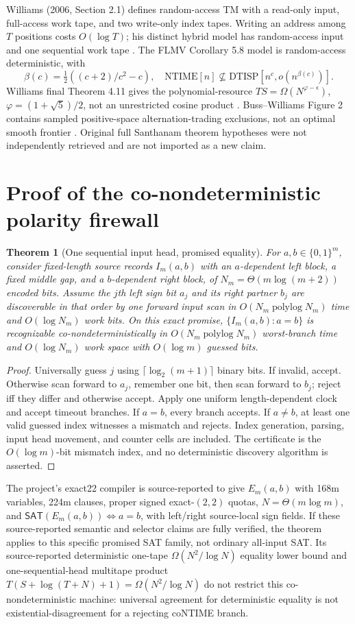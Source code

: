 \documentclass[11pt]{article}
\newtheorem{theorem}{Theorem}
\newcommand{\SAT}{\mathsf{SAT}}
\begin{document}
Williams (2006, Section 2.1) defines random-access TM with a read-only input, full-access work tape, and two write-only index tapes. Writing an address among $T$ positions costs $O(\log T)$; his distinct hybrid model has random-access input and one sequential work tape \cite{w06}. The FLMV Corollary 5.8 model is random-access deterministic, with
\[
\beta(c)=\tfrac12((c+2)/c^2-c),\quad
\mathrm{NTIME}[n]\not\subseteq\mathrm{DTISP}[n^c,o(n^{\beta(c)})].
\]
Williams final Theorem 4.11 gives the polynomial-resource $TS=\Omega(N^{\varphi-\epsilon})$, $\varphi=(1+\sqrt5)/2$, not an unrestricted cosine product \cite{w13}. Buss--Williams Figure 2 contains sampled positive-space alternation-trading exclusions, not an optimal smooth frontier \cite{bw}. Original full Santhanam theorem hypotheses were not independently retrieved and are not imported as a new claim.

\section{Proof of the co-nondeterministic polarity firewall}
\begin{theorem}[One sequential input head, promised equality]
For $a,b\in\{0,1\}^m$, consider fixed-length source records $I_m(a,b)$ with an $a$-dependent left block, a fixed middle gap, and a $b$-dependent right block, of $N_m=\Theta(m\log(m+2))$ encoded bits. Assume the $j$th left sign bit $a_j$ and its right partner $b_j$ are discoverable in that order by one forward input scan in $O(N_m\operatorname{polylog}N_m)$ time and $O(\log N_m)$ work bits. On this exact promise, $\{I_m(a,b):a=b\}$ is recognizable co-nondeterministically in $O(N_m\operatorname{polylog}N_m)$ worst-branch time and $O(\log N_m)$ work space with $O(\log m)$ guessed bits.
\end{theorem}
\begin{proof}
Universally guess $j$ using $\lceil\log_2(m+1)\rceil$ binary bits. If invalid, accept. Otherwise scan forward to $a_j$, remember one bit, then scan forward to $b_j$; reject iff they differ and otherwise accept. Apply one uniform length-dependent clock and accept timeout branches. If $a=b$, every branch accepts. If $a\ne b$, at least one valid guessed index witnesses a mismatch and rejects. Index generation, parsing, input head movement, and counter cells are included. The certificate is the $O(\log m)$-bit mismatch index, and no deterministic discovery algorithm is asserted.
\end{proof}
The project's exact22 compiler is source-reported to give $E_m(a,b)$ with 168m variables, 224m clauses, proper signed exact-$(2,2)$ quotas, $N=\Theta(m\log m)$, and $\SAT(E_m(a,b))\iff a=b$, with left/right source-local sign fields. If these source-reported semantic and selector claims are fully verified, the theorem applies to this specific promised SAT family, not ordinary all-input SAT. Its source-reported deterministic one-tape $\Omega(N^2/\log N)$ equality lower bound and one-sequential-head multitape product $T(S+\log(T+N)+1)=\Omega(N^2/\log N)$ do not restrict this co-nondeterministic machine: universal agreement for deterministic equality is not existential-disagreement for a rejecting coNTIME branch.
\end{document}
